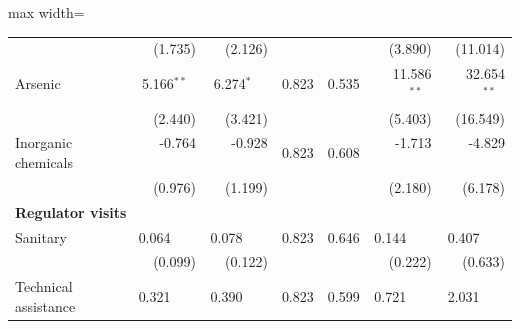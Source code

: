 \begin{table}[htbp]
{\begin{adjustbox}{max width=\linewidth}
\begin{tabular}{lrrrrrr}
 & (\phantom{-}1.735)\phantom{$^{***}$} & (\phantom{-}2.126)\phantom{$^{***}$} &  &  & (\phantom{-}\phantom{0}3.890)\phantom{$^{***}$} & (\phantom{-}11.014)\phantom{$^{***}$} \\
Arsenic & \phantom{(}\phantom{-}5.166$^{**\phantom{*}}$ & \phantom{(}\phantom{-}6.274$^{*\phantom{*}\phantom{*}}$ & \phantom{(}\phantom{-}0.823\phantom{$^{***}$} & \phantom{(}\phantom{-}0.535\phantom{$^{***}$} & \phantom{(}\phantom{-}11.586$^{**\phantom{*}}$ & \phantom{(}\phantom{-}32.654$^{**\phantom{*}}$ \\
 & (\phantom{-}2.440)\phantom{$^{***}$} & (\phantom{-}3.421)\phantom{$^{***}$} &  &  & (\phantom{-}\phantom{0}5.403)\phantom{$^{***}$} & (\phantom{-}16.549)\phantom{$^{***}$} \\
Inorganic chemicals & \phantom{(}-0.764$^{\phantom{*}\phantom{*}\phantom{*}}$ & \phantom{(}-0.928$^{\phantom{*}\phantom{*}\phantom{*}}$ & \phantom{(}\phantom{-}0.823\phantom{$^{***}$} & \phantom{(}\phantom{-}0.608\phantom{$^{***}$} & \phantom{(}-\phantom{0}1.713$^{\phantom{*}\phantom{*}\phantom{*}}$ & \phantom{(}-\phantom{0}4.829$^{\phantom{*}\phantom{*}\phantom{*}}$ \\
 & (\phantom{-}0.976)\phantom{$^{***}$} & (\phantom{-}1.199)\phantom{$^{***}$} &  &  & (\phantom{-}\phantom{0}2.180)\phantom{$^{***}$} & (\phantom{-}\phantom{0}6.178)\phantom{$^{***}$} \\
\multicolumn{7}{l}{\textbf{Regulator visits}} \\
Sanitary & \phantom{(}\phantom{-}0.064$^{\phantom{*}\phantom{*}\phantom{*}}$ & \phantom{(}\phantom{-}0.078$^{\phantom{*}\phantom{*}\phantom{*}}$ & \phantom{(}\phantom{-}0.823\phantom{$^{***}$} & \phantom{(}\phantom{-}0.646\phantom{$^{***}$} & \phantom{(}\phantom{-}\phantom{0}0.144$^{\phantom{*}\phantom{*}\phantom{*}}$ & \phantom{(}\phantom{-}\phantom{0}0.407$^{\phantom{*}\phantom{*}\phantom{*}}$ \\
 & (\phantom{-}0.099)\phantom{$^{***}$} & (\phantom{-}0.122)\phantom{$^{***}$} &  &  & (\phantom{-}\phantom{0}0.222)\phantom{$^{***}$} & (\phantom{-}\phantom{0}0.633)\phantom{$^{***}$} \\
Technical assistance & \phantom{(}\phantom{-}0.321$^{\phantom{*}\phantom{*}\phantom{*}}$ & \phantom{(}\phantom{-}0.390$^{\phantom{*}\phantom{*}\phantom{*}}$ & \phantom{(}\phantom{-}0.823\phantom{$^{***}$} & \phantom{(}\phantom{-}0.599\phantom{$^{***}$} & \phantom{(}\phantom{-}\phantom{0}0.721$^{\phantom{*}\phantom{*}\phantom{*}}$ & \phantom{(}\phantom{-}\phantom{0}2.031$^{\phantom{*}\phantom{*}\phantom{*}}$ \\

\end{tabular}
\end{adjustbox}}
\end{table}

